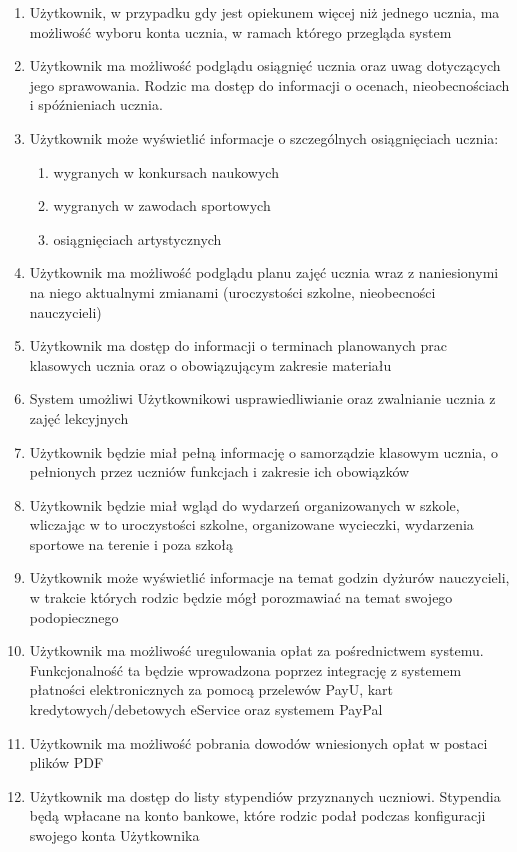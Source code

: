 \documentclass{article}
\begin{document}
\begin{enumerate}
	\item Użytkownik, w przypadku gdy jest opiekunem więcej niż jednego ucznia, ma możliwość wyboru konta ucznia, w ramach którego przegląda system
	\item Użytkownik ma możliwość podglądu osiągnięć ucznia oraz uwag dotyczących jego sprawowania. Rodzic ma dostęp do informacji o ocenach, nieobecnościach i spóźnieniach ucznia.
	\item Użytkownik może wyświetlić informacje o szczególnych osiągnięciach ucznia:
	\begin{enumerate}
		\item wygranych w konkursach naukowych
		\item wygranych w zawodach sportowych
		\item osiągnięciach artystycznych
	\end{enumerate}
	\item Użytkownik ma możliwość podglądu planu zajęć ucznia wraz z naniesionymi na niego aktualnymi zmianami (uroczystości szkolne, nieobecności nauczycieli)
	\item Użytkownik ma dostęp do informacji o terminach planowanych prac klasowych ucznia oraz o obowiązującym zakresie materiału
	\item System umożliwi Użytkownikowi usprawiedliwianie oraz zwalnianie ucznia z zajęć lekcyjnych
	\item Użytkownik będzie miał pełną informację o samorządzie klasowym ucznia, o pełnionych przez uczniów funkcjach i zakresie ich obowiązków
	\item Użytkownik będzie miał wgląd do wydarzeń organizowanych w szkole, wliczając w to uroczystości szkolne, organizowane wycieczki, wydarzenia sportowe na terenie i poza szkołą
	\item Użytkownik może wyświetlić informacje na temat godzin dyżurów nauczycieli, w trakcie których rodzic będzie mógł porozmawiać na temat swojego podopiecznego
	\item Użytkownik ma możliwość uregulowania opłat za pośrednictwem systemu. Funkcjonalność ta będzie wprowadzona poprzez integrację z systemem płatności elektronicznych za pomocą przelewów PayU, kart kredytowych/debetowych eService oraz systemem PayPal
	\item Użytkownik ma możliwość pobrania dowodów wniesionych opłat w postaci plików PDF
	\item Użytkownik ma dostęp do listy stypendiów przyznanych uczniowi. Stypendia będą wpłacane na konto bankowe, które rodzic podał podczas konfiguracji swojego konta Użytkownika

\end{enumerate}
\end{document}
